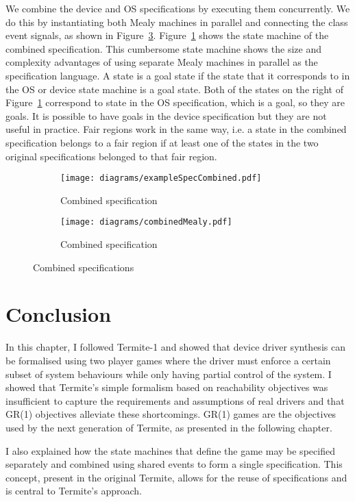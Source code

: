 We combine the device and OS specifications by executing them concurrently. We do this by instantiating both Mealy machines in parallel and connecting the class event signals, as shown in Figure~\ref{fig:combined_spec_mealy}. Figure~\ref{fig:combined_spec} shows the state machine of the combined specification. This cumbersome state machine shows the size and complexity advantages of using separate Mealy machines in parallel as the specification language. A state is a goal state if the state that it corresponds to in the OS or device state machine is a goal state. Both of the states on the right of Figure~\ref{fig:combined_spec} correspond to state  in the OS specification, which is a goal, so they are goals. It is possible to have goals in the device specification but they are not useful in practice. Fair regions work in the same way, i.e. a state in the combined specification belongs to a fair region if at least one of the states in the two original specifications belonged to that fair region.

\begin{figure}
\centering
\begin{subfigure}[t]{0.47\textwidth}
\texttt{[image: diagrams/exampleSpecCombined.pdf]}
\caption{Combined specification}
\label{fig:combined_spec}
\end{subfigure}
\hfill
\begin{subfigure}[t]{0.47\textwidth}
\texttt{[image: diagrams/combinedMealy.pdf]}
\caption{Combined specification}
\label{fig:combined_spec_mealy}
\end{subfigure}
\caption{Combined specifications}
\end{figure}

\section{Conclusion}

In this chapter, I followed Termite-1 and showed that device driver synthesis can be formalised using two player games where the driver must enforce a certain subset of system behaviours while only having partial control of the system. I showed that Termite's simple formalism based on reachability objectives was insufficient to capture the requirements and assumptions of real drivers and that GR(1) objectives alleviate these shortcomings. GR(1) games are the objectives used by the next generation of Termite, as presented in the following chapter. 

I also explained how the state machines that define the game may be specified separately and combined using shared events to form a single specification. This concept, present in the original Termite, allows for the reuse of specifications and is central to Termite's approach.

